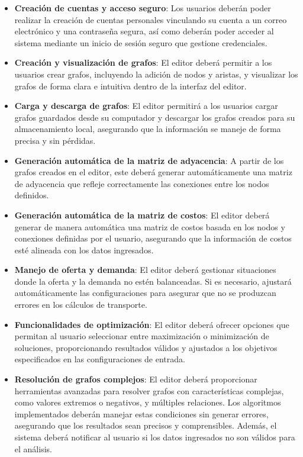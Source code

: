 \documentclass[stu, 12pt, letterpaper, donotrepeattitle, floatsintext, natbib]{apa7}
\begin{document}
\begin{itemize}
    \item \textbf{Creación de cuentas y acceso seguro}:  
    Los usuarios deberán poder realizar la creación de cuentas personales vinculando su cuenta a un correo electrónico y una contraseña segura, así como deberán poder acceder al sistema mediante un inicio de sesión seguro que gestione credenciales. 

    \item \textbf{Creación y visualización de grafos}: 
    El editor deberá permitir a los usuarios crear grafos, incluyendo la adición de nodos y aristas, y visualizar los grafos de forma clara e intuitiva dentro de la interfaz del editor.

    \item \textbf{Carga y descarga de grafos}: 
    El editor permitirá a los usuarios cargar grafos guardados desde su computador y descargar los grafos creados para su almacenamiento local, asegurando que la información se maneje de forma precisa y sin pérdidas.

    \item \textbf{Generación automática de la matriz de adyacencia}: 
    A partir de los grafos creados en el editor, este deberá generar automáticamente una matriz de adyacencia que refleje correctamente las conexiones entre los nodos definidos.

    \item \textbf{Generación automática de la matriz de costos}: 
    El editor deberá generar de manera automática una matriz de costos basada en los nodos y conexiones definidas por el usuario, asegurando que la información de costos esté alineada con los datos ingresados.

    \item \textbf{Manejo de oferta y demanda}: 
    El editor deberá gestionar situaciones donde la oferta y la demanda no estén balanceadas. Si es necesario, ajustará automáticamente las configuraciones para asegurar que no se produzcan errores en los cálculos de transporte.

    \item \textbf{Funcionalidades de optimización}: 
    El editor deberá ofrecer opciones que permitan al usuario seleccionar entre maximización o minimización de soluciones, proporcionando resultados válidos y ajustados a los objetivos especificados en las configuraciones de entrada.

    \item \textbf{Resolución de grafos complejos}:
    El editor deberá proporcionar herramientas avanzadas para resolver grafos con características complejas, como valores extremos o negativos, y múltiples relaciones. Los algoritmos implementados deberán manejar estas condiciones sin generar errores, asegurando que los resultados sean precisos y comprensibles. Además, el sistema deberá notificar al usuario si los datos ingresados no son válidos para el análisis.


\end{itemize}
\end{document}

